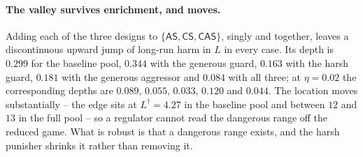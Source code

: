 \documentclass[pdflatex]{sn-jnl}
\theoremstyle{thmstyleone}
\theoremstyle{thmstylethree}
\theoremstyle{thmstyletwo}
\newcommand{\AS}{\textsf{AS}}
\newcommand{\CS}{\textsf{CS}}
\newcommand{\CAS}{\textsf{CAS}}
\begin{document}
\paragraph{The valley survives enrichment, and moves.}
Adding each of the three designs to $\{\AS,\CS,\CAS\}$, singly and together,
leaves a discontinuous upward jump of long-run harm in $L$ in every case. Its
depth is $0.299$ for the baseline pool, $0.344$ with the generous guard,
$0.163$ with the harsh guard, $0.181$ with the generous aggressor and $0.084$
with all three; at $\eta=0.02$ the corresponding depths are $0.089$, $0.055$,
$0.033$, $0.120$ and $0.044$. The location moves substantially -- the edge
sits at $L^{\dagger}=4.27$ in the baseline pool and between $12$ and $13$ in
the full pool -- so a regulator cannot read the dangerous range off the
reduced game. What is robust is that a dangerous range exists, and the harsh
punisher shrinks it rather than removing it.
\end{document}
